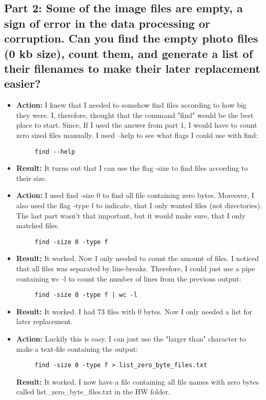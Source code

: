 \documentclass{article}
\begin{document}
\subsection{Part 2: Some of the image files are empty, a sign of error in the data processing or corruption. Can you find the empty photo files (0 kb size), count them, and generate a list of their filenames to make their later replacement easier?}
\begin{itemize}
    \item \textbf{Action:} I knew that I needed to somehow find files according to how big they were. I, therefore, thought that the command "find" would be the best place to start. Since, If I used the answer from part 1, I would have to count zero sized files manually. I used --help to see what flags I could use with find:
    \begin{verbatim}
     find --help
    \end{verbatim}
    \item \textbf{Result:} It turns out that I can use the flag -size to find files according to their size.
    \item \textbf{Action:} I used find -size 0 to find all file containing zero bytes. Moreover, I also used the flag -type f to indicate, that I only wanted files (not directories). The last part wasn't that important, but it would make sure, that I only matched files.
    \begin{verbatim}
     find -size 0 -type f
    \end{verbatim}
    \item \textbf{Result:} It worked. Now I only needed to count the amount of files. I noticed that all files was separated by line-breaks. Therefore, I could just use a pipe containing wc -l to count the number of lines from the previous output:
    \begin{verbatim}
     find -size 0 -type f | wc -l
    \end{verbatim}
    \item \textbf{Result:} It worked. I had 73 files with 0 bytes. Now I only needed a list for later replacement.  
    \item \textbf{Action:} Luckily this is easy. I can just use the "larger than" character to make a text-file containing the output:
    \begin{verbatim}
     find -size 0 -type f > list_zero_byte_files.txt
    \end{verbatim}
    \textbf{Result:} It worked. I now have a file containing all file names with zero bytes called list\_zero\_byte\_files.txt in the HW folder. 
\end{itemize}
\end{document}
